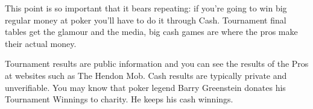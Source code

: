 This point is so important that it bears repeating: if you're going to
win big regular money at poker you'll have to do it through Cash.
Tournament final tables get the glamour and the media, big cash games
are where the pros make their actual money.

Tournament results are public information and you can see the results
of the Pros at websites such as The Hendon Mob. Cash results are
typically private and unverifiable. You may know that poker legend
Barry Greenstein donates his Tournament Winnings to charity. He keeps
his cash winnings.





